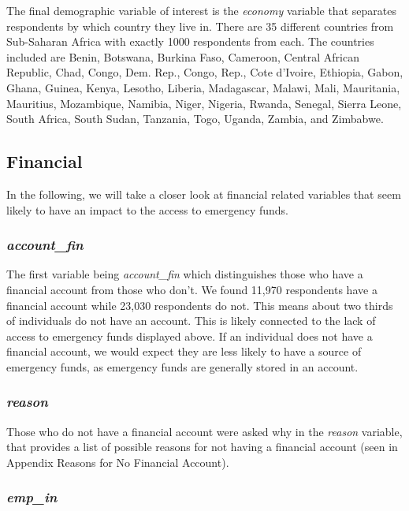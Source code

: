 \documentclass[water,article,submit,moreauthors,pdftex]{mdpi}
\begin{document}
The final demographic variable of interest is the \emph{economy}
variable that separates respondents by which country they live in. There
are 35 different countries from Sub-Saharan Africa with exactly 1000
respondents from each. The countries included are Benin, Botswana,
Burkina Faso, Cameroon, Central African Republic, Chad, Congo, Dem.
Rep., Congo, Rep., Cote d'Ivoire, Ethiopia, Gabon, Ghana, Guinea, Kenya,
Lesotho, Liberia, Madagascar, Malawi, Mali, Mauritania, Mauritius,
Mozambique, Namibia, Niger, Nigeria, Rwanda, Senegal, Sierra Leone,
South Africa, South Sudan, Tanzania, Togo, Uganda, Zambia, and Zimbabwe.

\hypertarget{financial}{%
\subsection{Financial}\label{financial}}

In the following, we will take a closer look at financial related
variables that seem likely to have an impact to the access to emergency
funds.

\hypertarget{account_fin}{%
\subsubsection{\texorpdfstring{\emph{account\_fin}}{account\_fin}}\label{account_fin}}

The first variable being \emph{account\_fin} which distinguishes those
who have a financial account from those who don't. We found 11,970
respondents have a financial account while 23,030 respondents do not.
This means about two thirds of individuals do not have an account. This
is likely connected to the lack of access to emergency funds displayed
above. If an individual does not have a financial account, we would
expect they are less likely to have a source of emergency funds, as
emergency funds are generally stored in an account.

\hypertarget{reason}{%
\subsubsection{\texorpdfstring{\emph{reason}}{reason}}\label{reason}}

Those who do not have a financial account were asked why in the
\emph{reason} variable, that provides a list of possible reasons for not
having a financial account (seen in Appendix Reasons for No Financial
Account).

\hypertarget{emp_in}{%
\subsubsection{\texorpdfstring{\emph{emp\_in}}{emp\_in}}\label{emp_in}}
\end{document}
